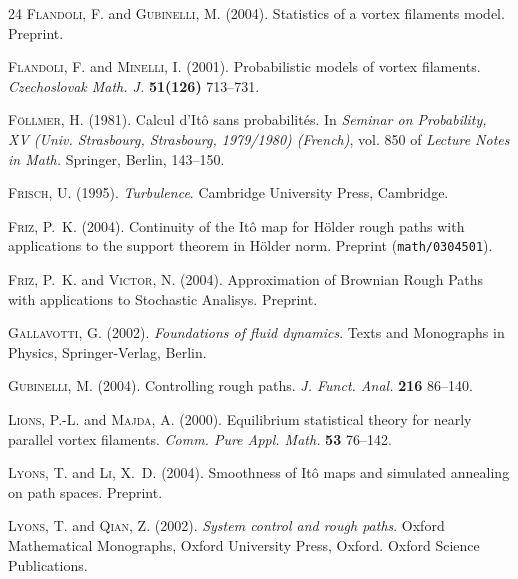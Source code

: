 \documentclass[a4paper,12pt,reqno]{amsart}
\begin{document}
\begin{thebibliography}{24}
\textsc{Flandoli, F.} and \textsc{Gubinelli, M.} (2004).
\newblock Statistics of a vortex filaments model.
\newblock Preprint.

\textsc{Flandoli, F.} and \textsc{Minelli, I.} (2001).
\newblock Probabilistic models of vortex filaments.
\newblock \textit{Czechoslovak Math. J.} \textbf{51(126)} 713--731.

\textsc{F{\"o}llmer, H.} (1981).
\newblock Calcul d'{I}t\^o sans probabilit\'es.
\newblock In \textit{Seminar on Probability, XV (Univ. Strasbourg, Strasbourg,
  1979/1980) (French)}, vol. 850 of \textit{Lecture Notes in Math.} Springer,
  Berlin, 143--150.

\textsc{Frisch, U.} (1995).
\newblock \textit{Turbulence}.
\newblock Cambridge University Press, Cambridge.


\textsc{Friz, P.~K.} (2004).
\newblock Continuity of the {I}t\^o map for {H}\"older rough paths with
  applications to the support theorem in {H}\"older norm.
\newblock Preprint ({\tt math/0304501}).


\textsc{Friz, P.~K.} and \textsc{Victor, N.} (2004).
\newblock Approximation of {B}rownian {R}ough {P}aths with applications to
{S}tochastic {A}nalisys.
\newblock Preprint.

\textsc{Gallavotti, G.} (2002).
\newblock \textit{Foundations of fluid dynamics}.
\newblock Texts and Monographs in Physics, Springer-Verlag, Berlin.


\textsc{Gubinelli, M.} (2004).
\newblock Controlling rough paths.
\newblock \textit{J. Funct. Anal.} \textbf{216} 86--140.

\textsc{Lions, P.-L.} and \textsc{Majda, A.} (2000).
\newblock Equilibrium statistical theory for nearly parallel vortex filaments.
\newblock \textit{Comm. Pure Appl. Math.} \textbf{53} 76--142.

\textsc{Lyons, T.} and \textsc{Li, X.~D.} (2004).
\newblock Smoothness of {I}t\^o maps and simulated annealing on path spaces.
\newblock Preprint.

\textsc{Lyons, T.} and \textsc{Qian, Z.} (2002).
\newblock \textit{System control and rough paths}.
\newblock Oxford Mathematical Monographs, Oxford University Press, Oxford.
\newblock Oxford Science Publications.


\end{thebibliography}
\end{document}

